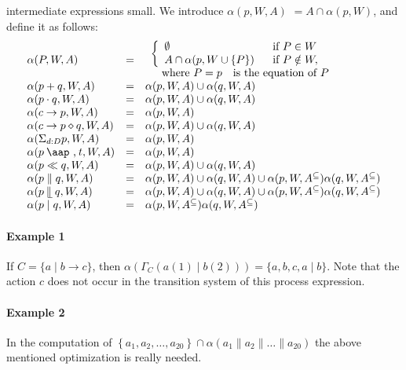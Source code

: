 \documentclass{article}
\providecommand{\at}{\mathbin{\mbox{\aap ,}}}
\providecommand{\leftmerge}{\mathbin{\mathrel{\llfloor}}}
\begin{document}
intermediate expressions small. We introduce $\alpha (p,W,A)$ $=A\cap \alpha
(p,W)$, and define it as follows:%
\[
\begin{array}{lll}
\alpha (P,W,A) & = & 
\begin{array}{l}
\left\{ 
\begin{array}{ll}
\emptyset & \text{if }P\in W \\ 
A\cap \alpha (p,W\cup \{P\}) & \text{if }P\notin W,%
\end{array}%
\right. \\ 
\text{ where }P=p\text{ is the equation of }P%
\end{array}
\\ 
\alpha (p+q,W,A) & = & \alpha (p,W,A)\cup \alpha (q,W,A) \\ 
\alpha (p\cdot q,W,A) & = & \alpha (p,W,A)\cup \alpha (q,W,A) \\ 
\alpha (c\rightarrow p,W,A) & = & \alpha (p,W,A) \\ 
\alpha (c\rightarrow p\diamond q,W,A) & = & \alpha (p,W,A)\cup \alpha (q,W,A)
\\ 
\alpha (\Sigma _{d:D}p,W,A) & = & \alpha (p,W,A) \\ 
\alpha (p\at t,W,A) & = & \alpha (p,W,A) \\ 
\alpha (p\ll q,W,A) & = & \alpha (p,W,A)\cup \alpha (q,W,A) \\ 
\alpha (p\parallel q,W,A) & = & \alpha (p,W,A)\cup \alpha (q,W,A)\cup \alpha
(p,W,A^{\subseteq })\alpha (q,W,A^{\subseteq }) \\ 
\alpha (p\leftmerge q,W,A) & = & \alpha (p,W,A)\cup \alpha (q,W,A)\cup
\alpha (p,W,A^{\subseteq })\alpha (q,W,A^{\subseteq }) \\ 
\alpha (p\mid q,W,A) & = & \alpha (p,W,A^{\subseteq })\alpha
(q,W,A^{\subseteq })%
\end{array}%
\]

\paragraph{Example 1}

If $C=\{a\mid b\rightarrow c\}$, then $\alpha (\Gamma _{C}(a(1)\mid
b(2)))=\{a,b,c,a\mid b\}$. Note that the action $c$ does not occur in the
transition system of this process expression.

\paragraph{Example 2}

In the computation of $\left\{ a_{1},a_{2},\ldots ,a_{20}\right\} \cap
\alpha \left( a_{1}\parallel a_{2}\parallel \ldots \parallel a_{20}\right) $
the above mentioned optimization is really needed.
\end{document}
